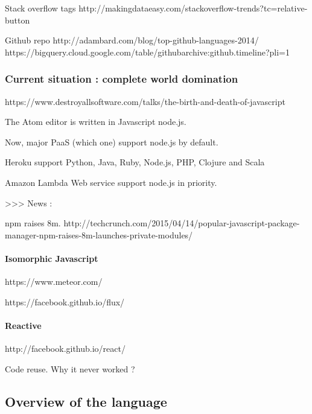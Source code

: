 Stack overflow tags
http://makingdataeasy.com/stackoverflow-trends?tc=relative-button


Github repo
http://adambard.com/blog/top-github-languages-2014/
https://bigquery.cloud.google.com/table/githubarchive:github.timeline?pli=1

\subsubsection{Current situation : complete world domination}

https://www.destroyallsoftware.com/talks/the-birth-and-death-of-javascript

The Atom editor is written in Javascript node.js.



Now, major PaaS (which one) support node.js by default.

Heroku support Python, Java, Ruby, Node.js, PHP, Clojure and Scala

Amazon Lambda Web service support node.js in priority.


>>> News :

npm raises 8m.
http://techcrunch.com/2015/04/14/popular-javascript-package-manager-npm-raises-8m-launches-private-modules/


\paragraph{Isomorphic Javascript}

https://www.meteor.com/

https://facebook.github.io/flux/


\paragraph{Reactive}

http://facebook.github.io/react/

Code reuse.
Why it never worked ?


\subsection{Overview of the language}

